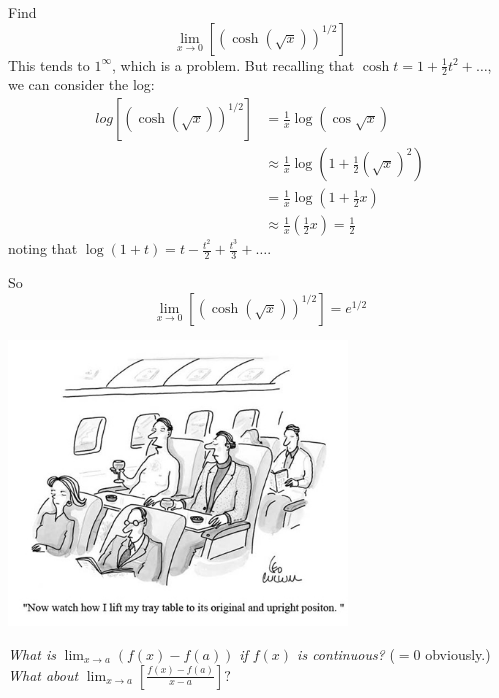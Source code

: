 \documentclass[10pt]{scrartcl}
\begin{document}
\begin{example}
Find 
\[\lim_{x\to 0} \left[(\cosh(\sqrt{x}))^{1/2}\right]\]	
This tends to $1^{\infty}$, which is a problem. But recalling that $\cosh t = 1 + \frac{1}{2}t^2 + \dots$, we can consider the log:
\[\begin{aligned}
log\left[(\cosh(\sqrt{x}))^{1/2}\right] &= \frac{1}{x}\log(\cos\sqrt{x})\\
&\approx \frac{1}{x}\log(1 + \frac{1}{2}(\sqrt{x})^2)\\
&= \frac{1}{x}\log(1 + \frac{1}{2}x)\\
&\approx \frac{1}{x}\left(\frac{1}{2}x\right) = \frac{1}{2}	
\end{aligned}
\]
noting that $\log(1+t) = t - \frac{t^2}{2} + \frac{t^3}{3} + \dots$. 

So
\[\lim_{x \to 0}\left[(\cosh(\sqrt{x}))^{1/2}\right]  = e^{1/2}\]
\end{example}
\vspace*{1.5cm}


\begin{center}
\includegraphics[width = 9cm]{cartoon2.jpg}
\end{center}





\emph{What is}  $\lim_{x\to a} (f(x) - f(a))$ 
\emph{if $f(x)$ is continuous?} ($=0$ obviously.)\\


\emph{What about}
$\lim_{x \to a} \left[\frac{f(x) - f(a)}{x-a}\right] ?$
\end{document}
